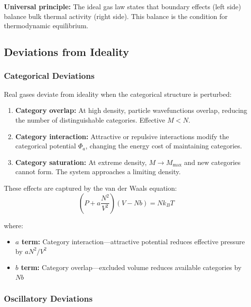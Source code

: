 \textbf{Universal principle:} The ideal gas law states that boundary effects (left side) balance bulk thermal activity (right side). This balance is the condition for thermodynamic equilibrium.

\subsection{Deviations from Ideality}

\subsubsection{Categorical Deviations}

Real gases deviate from ideality when the categorical structure is perturbed:

\begin{enumerate}
\item \textbf{Category overlap:} At high density, particle wavefunctions overlap, reducing the number of distinguishable categories. Effective $M < N$.

\item \textbf{Category interaction:} Attractive or repulsive interactions modify the categorical potential $\Phi_a$, changing the energy cost of maintaining categories.

\item \textbf{Category saturation:} At extreme density, $M \to M_{\max}$ and new categories cannot form. The system approaches a limiting density.
\end{enumerate}

These effects are captured by the van der Waals equation:
\begin{equation}
\left(P + a\frac{N^2}{V^2}\right)(V - Nb) = Nk_B T
\end{equation}

where:
\begin{itemize}
\item \textbf{$a$ term:} Category interaction---attractive potential reduces effective pressure by $a N^2/V^2$
\item \textbf{$b$ term:} Category overlap---excluded volume reduces available categories by $Nb$
\end{itemize}

\subsubsection{Oscillatory Deviations}


